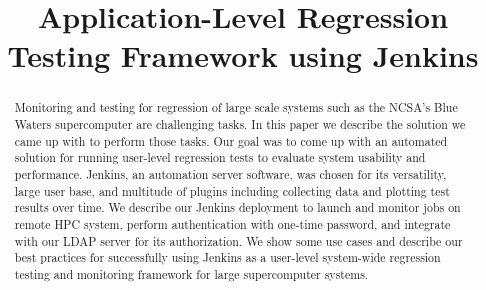 \documentclass[10pt, conference, compsocconf]{IEEEtran}
\begin{document}
\title{Application-Level Regression Testing Framework using Jenkins}




%

\author{

\and


}

\maketitle
\thispagestyle{plain}

\begin{abstract}
Monitoring and testing for regression of large scale systems such as the NCSA's Blue Waters supercomputer are challenging tasks. 
In this paper we describe the solution we came up with to perform those tasks. 
Our goal was to come up with an automated solution for running user-level regression tests to evaluate system usability and performance.
Jenkins, an automation server software, was chosen for its versatility, large user base, and multitude of plugins including collecting data and plotting test results over time. 
We describe our Jenkins deployment to launch and monitor jobs on remote HPC system, perform authentication with one-time password, and integrate with our LDAP server for its authorization. 
We show some use cases and describe our best practices for successfully using Jenkins as a user-level system-wide regression testing and monitoring framework for large supercomputer systems.

\end{abstract}
\end{document}
